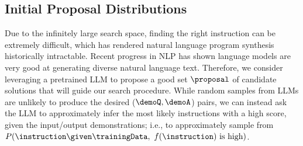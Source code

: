 
\subsection{Initial Proposal Distributions}\label{subsec:initialU}
Due to the infinitely large search space, finding the right instruction can be extremely difficult, which has rendered natural language program synthesis historically intractable. Recent progress in NLP has shown language models are very good at generating diverse natural language text. Therefore, we consider leveraging a pretrained LLM to propose a good set $\proposal$ of candidate solutions that will guide our search procedure. While random samples from LLMs are unlikely to produce the desired ($\demoQ, \demoA$) pairs, we can instead ask the LLM to approximately infer the most likely instructions with a high score, given the input/output demonstrations; i.e., to approximately sample from $P(\instruction\given\trainingData,\ f(\instruction)\textrm{ is high})$.

